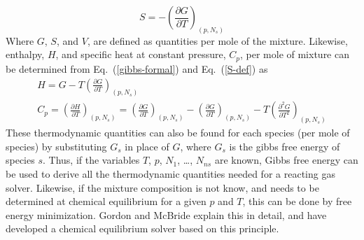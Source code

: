 \documentclass[a4paper]{article}
\newcommand{\eref}[1]{Eq.~(\ref{#1})}
\newcommand{\pd}[2]{\frac{\partial #1}{\partial #2}}
\newcommand{\pnd}[3]{\frac{\partial^{#3} #1}{\partial #2^{#3}}}
\begin{document}
\begin{enumerate}
    \begin{equation}
      \boxed{ S = -\left( \pd{G}{T} \right)_{(p,N_s)}}
      \label{S-def}
    \end{equation}
    Where $G$, $S$, and $V$, are defined as quantities per mole of the mixture.
    Likewise, enthalpy, $H$, and specific heat at constant pressure, $C_p$, per
    mole of mixture can be determined from \eref{gibbs-formal} and
    \eref{S-def} as
    \begin{gather}
      \boxed{H = G - T\left( \pd{G}{T} \right)_{(p,N_s)}} \label{h-def} \\
      \boxed{C_p = \left(\pd{H}{T}\right)_{(p,N_s)} 
      = \left( \pd{G}{T} \right)_{(p,N_s)} - \left( \pd{G}{T} \right)_{(p,N_s)}
      - T\left( \pnd{G}{T}{2} \right)_{(p,N_s)}}
      \label{cp-def} \end{gather}
    These thermodynamic quantities can also be found for each species (per mole
    of species) by substituting $G_s$ in place of $G$, where $G_s$ is the gibbs
    free energy of species $s$.  Thus, if the variables $T$, $p$, $N_1$, \dots,
    $N_{ns}$ are known, Gibbs free energy can be used to derive all the
    thermodynamic quantities needed for a reacting gas solver.  Likewise, if the
    mixture composition is not know, and needs to be determined at chemical
    equilibrium for a given $p$ and $T$, this can be done by free energy
    minimization.  Gordon and McBride\cite{mcbride} explain this in detail, and
    have developed a chemical equilibrium solver based on this principle.
    

\end{enumerate}
\end{document}
